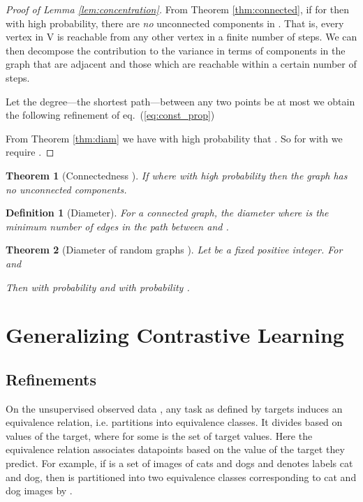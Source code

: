 \documentclass{article}
\def\eqref#1{eq.~(\ref{#1})}
\newtheorem{theorem}{Theorem}
\newtheorem{definition}{Definition}
\begin{document}
\begin{proof}[Proof of Lemma \ref{lem:concentration}]
 From Theorem \ref{thm:connected}, if  for  then with high probability, there are \emph{no} unconnected components in . That is, every vertex in V is reachable from any other vertex in a finite number of steps. We can then decompose the contribution to the variance in terms of components in the graph that are adjacent and those which are reachable within a certain number of steps.

Let the degree---the shortest path---between any two points be at most  we obtain the following refinement of \eqref{eq:const_prop}

From Theorem \ref{thm:diam} we have with high probability that . So for  with  we require .
\end{proof}


\begin{theorem}[Connectedness \citep{erdHos1960evolution}\label{thm:connected}]
If  where  with high probability then the graph  has no unconnected components.
\end{theorem}

\begin{definition}[Diameter]
For a connected graph,  the diameter  where  is the minimum number of edges in the path between  and .
\end{definition}

\begin{theorem}[Diameter of random graphs \citep{frieze2016introduction}\label{thm:diam}]
Let  be a fixed positive integer. For  and

Then  with probability  and  with probability .
\end{theorem} \section{Generalizing Contrastive Learning} \label{sec:refinements_app}

\subsection{Refinements}

On the unsupervised observed data , any task as defined by targets  induces an equivalence relation, i.e.  partitions  into equivalence classes. 
It divides  based on values of the target,  where  for some  is the set of target values. Here the equivalence relation associates datapoints based on the value of the target they predict. 
For example, if  is a set of images of cats and dogs and  denotes labels cat and dog, then  is partitioned into two equivalence classes corresponding to cat and dog images by . 
\end{document}
